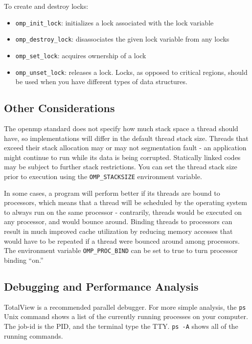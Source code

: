 \documentclass[10pt]{article}
\begin{document}
\begin{flushleft}
To create and destroy locks:

\begin{itemize}
\item {\tt omp\_init\_lock}: initializes a lock associated with the lock variable
\item {\tt omp\_destroy\_lock}: disassociates the given lock variable from any locks
\item {\tt omp\_set\_lock}: acquires ownership of a lock
\item {\tt omp\_unset\_lock}: releases a lock. Locks, as opposed to critical regions, should be used when you have different types of data structures.
\end{itemize}

\subsection{Other Considerations}

The \gls{openmp} standard does not specify how much stack space a thread should have, so implementations will differ in the default thread stack size. Threads that exceed their stack allocation may or may not segmentation fault - an application might continue to run while its data is being corrupted. Statically linked codes may be subject to further stack restrictions. You can set the thread stack size prior to execution using the {\tt OMP\_STACKSIZE} environment variable. 

In some cases, a program will perform better if its threads are bound to processors, which means that a thread will be scheduled by the operating system to always run on the same processor - contrarily, threads would be executed on any processor, and would bounce around.  Binding threads to processors can result in much improved cache utilization by reducing memory accesses that would have to be repeated if a thread were bounced around among processors. The environment variable {\tt OMP\_PROC\_BIND} can be set to true to turn processor binding ``on.'' 

\subsection{Debugging and Performance Analysis}

TotalView is a recommended parallel debugger. For more simple analysis, the {\tt ps} Unix command shows a list of the currently running processes on your computer. The job-id is the PID, and the terminal type the TTY. {\tt ps -A} shows all of the running commands. 


\end{flushleft}
\end{document}
